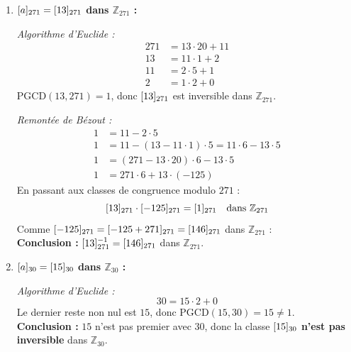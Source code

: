\begin{enumerate}[label=\thechapter.\arabic*, font=\bfseries, itemsep=7mm,labelsep*=3mm,left=0mm]
\begin{enumerate}[label=\textbf{\arabic*)}, leftmargin=*]
	\textit{Algorithme d'Euclide :}
	\[
	26 = 25 \cdot 1 + 1 \implies 1 = 25 \cdot (-1) + 26 \cdot 1
	\]
	$\text{PGCD}(25, 26) = 1$, donc $\cl[26]{25}$ est inversible dans $\mathbb{Z}_{26}$.
	
	En passant aux classes modulo $26$ :
	\[
	\cl[26]{25} \cdot \cl[26]{-1} = \cl[26]{1} \quad \text{dans } \mathbb{Z}_{26}
	\]
	Comme $\cl[26]{-1} = \cl[26]{25}$ dans $\mathbb{Z}_{26}$ : \\
	\textbf{Conclusion :} $\cl[26]{25}^{-1} = \cl[26]{25}$ dans $\mathbb{Z}_{26}$.
	
	\item \textbf{$\cl[271]{a} = \cl[271]{13}$ dans $\mathbb{Z}_{271}$ :}
	
	\textit{Algorithme d'Euclide :}
	\begin{align*}
		271 &= 13 \cdot 20 + 11 \\
		13 &= 11 \cdot 1 + 2 \\
		11 &= 2 \cdot 5 + 1 \\
		2 &= 1 \cdot 2 + 0
	\end{align*}
	$\text{PGCD}(13, 271) = 1$, donc $\cl[271]{13}$ est inversible dans $\mathbb{Z}_{271}$.
	
	\textit{Remontée de Bézout :}
	\begin{align*}
		1 &= 11 - 2 \cdot 5 \\
		1 &= 11 - (13 - 11 \cdot 1) \cdot 5 = 11 \cdot 6 - 13 \cdot 5 \\
		1 &= (271 - 13 \cdot 20) \cdot 6 - 13 \cdot 5 \\
		1 &= 271 \cdot 6 + 13 \cdot (-125)
	\end{align*}
	En passant aux classes de congruence modulo $271$ :
	\[
	\cl[271]{13} \cdot \cl[271]{-125} = \cl[271]{1} \quad \text{dans } \mathbb{Z}_{271}
	\]
	Comme $\cl[271]{-125} = \cl[271]{-125 + 271} = \cl[271]{146}$ dans $\mathbb{Z}_{271}$ : \\
	\textbf{Conclusion :} $\cl[271]{13}^{-1} = \cl[271]{146}$ dans $\mathbb{Z}_{271}$.
	
	\item \textbf{$\cl[30]{a} = \cl[30]{15}$ dans $\mathbb{Z}_{30}$ :}
	
	\textit{Algorithme d'Euclide :}
	\[
	30 = 15 \cdot 2 + 0
	\]
	Le dernier reste non nul est $15$, donc $\text{PGCD}(15, 30) = 15 \neq 1$. \\
	\textbf{Conclusion :} $15$ n'est pas premier avec $30$, donc la classe $\cl[30]{15}$ \textbf{n'est pas inversible} dans $\mathbb{Z}_{30}$.
\end{enumerate}



\end{enumerate}

